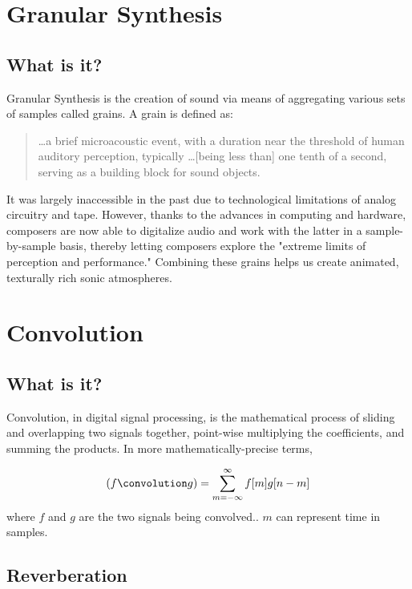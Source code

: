 \documentclass{article}
\begin{document}
	\section{Granular Synthesis}
		\subsection{What is it?}
			Granular Synthesis is the creation of sound via means of aggregating various sets of samples called grains. A grain is defined as:
			\begin{quote} 
				\ldots a brief microacoustic event, with a duration near the threshold of human auditory perception, typically \ldots [being less than] one tenth of a second, serving as a building block for sound objects.\cite[Loc. 1024]{Curtis_gs_def} 
			\end{quote}

			It was largely inaccessible in the past due to technological limitations of analog circuitry and tape. However, thanks to the advances in computing and hardware, composers are now able to digitalize audio and work with the latter in a sample-by-sample basis, thereby letting composers explore the "extreme limits of perception and performance."\cite[Loc. 334]{Curtis_gs}  Combining these grains helps us create animated, texturally rich sonic atmospheres.\cite[Loc. 1024]{Curtis_gs_def}    
			
	\section{Convolution}
		\subsection{What is it?}
			Convolution, in digital signal processing, is the mathematical process of sliding and overlapping two signals together, point-wise multiplying the coefficients, and summing the products. In more mathematically-precise terms, 

		\begin{equation}
			(f \convolution g) = \sum_{m=-\infty}^{\infty} f[m] g[n-m] 
		\end{equation} 
		where $f$ and $g$ are the two signals being convolved.\cite[pp. 121]{JOS_conv}. $m$ can represent time in samples.

		\subsection{Reverberation}
\end{document}
